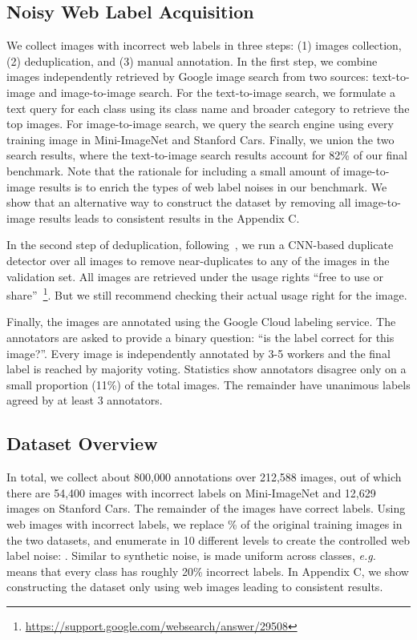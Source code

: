 \documentclass{article}
\newcommand{\eg}{\emph{e.g.}} \newcommand{\Eg}{\emph{E.g}}
\begin{document}
\subsection{Noisy Web Label Acquisition}
We collect images with incorrect web labels in three steps: (1) images collection, (2) deduplication, and (3) manual annotation. In the first step, we combine images independently retrieved by Google image search from two sources: text-to-image and image-to-image search. For the text-to-image search, we formulate a text query for each class using its class name and broader category to retrieve the top images. For image-to-image search, we query the search engine using every training image in Mini-ImageNet and Stanford Cars. 
Finally, we union the two search results, where the text-to-image search results account for 82\% of our final benchmark. Note that the rationale for including a small amount of image-to-image results is to enrich the types of web label noises in our benchmark. We show that an alternative way to construct the dataset by removing all image-to-image results leads to consistent results in the Appendix C.

In the second step of deduplication, following~\citep{kornblith2019better}, we run a CNN-based duplicate detector over all images to remove near-duplicates to any of the images in the validation set. All images are retrieved under the usage rights ``free to use or share''~\footnote{\scriptsize \url{https://support.google.com/websearch/answer/29508}}. But we still recommend checking their actual usage right for the image.

Finally, the images are annotated using the Google Cloud labeling service. The annotators are asked to provide a binary question: ``is the label correct for this image?''. Every image is independently annotated by 3-5 workers and the final label is reached by majority voting. Statistics show annotators disagree only on a small proportion (11\%) of the total images. The remainder have unanimous labels agreed by at least 3 annotators.

\subsection{Dataset Overview}
In total, we collect about 800,000 annotations over 212,588 images, out of which there are 54,400 images with incorrect labels on Mini-ImageNet and 12,629 images on Stanford Cars. The remainder of the images have correct labels.
Using web images with incorrect labels, we replace \% of the original training images in the two datasets, and enumerate  in 10 different levels to create the controlled web label noise: . Similar to synthetic noise,  is made uniform across classes, \eg~ means that every class has roughly 20\% incorrect labels. In Appendix C, we show constructing the dataset only using web images leading to consistent results.
\end{document}
